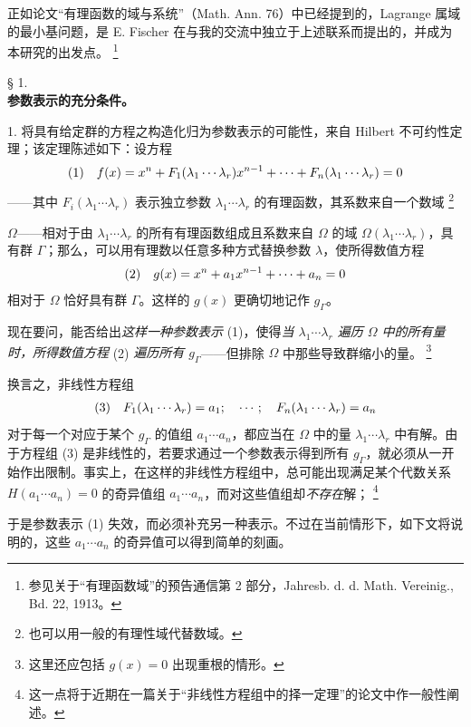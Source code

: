 \documentclass[11pt]{article}
\providecommand{\glqq}{“}
\providecommand{\grqq}{”}
\providecommand{\srcfn}[2]{%
  \begingroup
  \renewcommand{\thefootnote}{#1}%
  \footnote{#2}%
  \addtocounter{footnote}{-1}%
  \endgroup}
\begin{document}
正如论文\glqq{}有理函数的域与系统\grqq{}（Math. Ann. 76）中已经提到的，Lagrange 属域的最小基问题，是 E. Fischer 在与我的交流中独立于上述联系而提出的，并成为本研究的出发点。\srcfn{**)}{参见关于\glqq{}有理函数域\grqq{}的预告通信第 2 部分，Jahresb. d. d. Math. Vereinig., Bd. 22, 1913。}

\begin{center}
§ 1.\\[0.75em]
\textbf{参数表示的充分条件。}
\end{center}

1. 将具有给定群的方程之构造化归为参数表示的可能性，来自 Hilbert 不可约性定理；该定理陈述如下：设方程
\[
\begin{array}{@{}l@{\quad}l@{}}
(1)& \displaystyle f(x)=x^n+F_1(\lambda_1\cdots\lambda_r)x^{n-1}+\cdots+F_n(\lambda_1\cdots\lambda_r)=0
\end{array}
\]
——其中 $F_i(\lambda_1\cdots\lambda_r)$ 表示独立参数 $\lambda_1\cdots\lambda_r$ 的有理函数，其系数来自一个数域\srcfn{***)}{也可以用一般的有理性域代替数域。}$\Omega$——相对于由 $\lambda_1\cdots\lambda_r$ 的所有有理函数组成且系数来自 $\Omega$ 的域 $\Omega(\lambda_1\cdots\lambda_r)$，具有群 $\Gamma$；那么，可以用有理数以任意多种方式替换参数 $\lambda$，使所得数值方程
\[
\begin{array}{@{}l@{\quad}l@{}}
(2)& \displaystyle g(x)=x^n+a_1x^{n-1}+\cdots+a_n=0
\end{array}
\]
相对于 $\Omega$ 恰好具有群 $\Gamma$。这样的 $g(x)$ 更确切地记作 $g_\Gamma$。

现在要问，能否给出\emph{这样一种参数表示} (1)，使得\emph{当 $\lambda_1\cdots\lambda_r$ 遍历 $\Omega$ 中的所有量时，所得数值方程} (2) \emph{遍历所有 $g_\Gamma$}——但排除 $\Omega$ 中那些导致群缩小的量。\srcfn{*)}{这里还应包括 $g(x)=0$ 出现重根的情形。}换言之，非线性方程组
\[
\begin{array}{@{}l@{\quad}l@{}}
(3)& \displaystyle F_1(\lambda_1\cdots\lambda_r)=a_1;\quad \cdots;\quad F_n(\lambda_1\cdots\lambda_r)=a_n
\end{array}
\]
对于每一个对应于某个 $g_\Gamma$ 的值组 $a_1\cdots a_n$，都应当在 $\Omega$ 中的量 $\lambda_1\cdots\lambda_r$ 中有解。由于方程组 (3) 是非线性的，若要求通过一个参数表示得到所有 $g_\Gamma$，就必须从一开始作出限制。事实上，在这样的非线性方程组中，总可能出现满足某个代数关系 $H(a_1\cdots a_n)=0$ 的奇异值组 $a_1\cdots a_n$，而对这些值组却\emph{不存在}解；\srcfn{**)}{这一点将于近期在一篇关于\glqq{}非线性方程组中的择一定理\grqq{}的论文中作一般性阐述。}于是参数表示 (1) 失效，而必须补充另一种表示。不过在当前情形下，如下文将说明的，这些 $a_1\cdots a_n$ 的奇异值可以得到简单的刻画。
\end{document}
